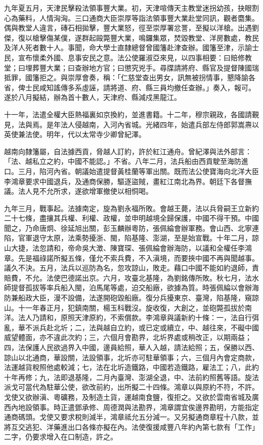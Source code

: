 \begin{pinyinscope}
九年夏五月，天津民擊殺法領事豐大業。初，天津喧傳天主教堂迷拐幼孩，抉眼割心為藥料，人情洶洶。三口通商大臣崇厚等詣法領事豐大業赴堂同訊，觀者麕集。偶與教堂人違言，磚石相拋擊，豐大業怒，徑至崇厚署忿詈，至擬以洋槍。出遇劉傑，復以槍擊傷某僕，遂群起毆斃豐大業，鳴鑼集眾，焚毀教堂、洋房數處，教民及洋人死者數十人。事聞，命大學士直隸總督曾國籓赴津查辦。國籓至津，示諭士民，宣布懷柔外國、息事安民之意。法公使羅淑亞來見，以四事相要：曰賠修教堂；曰埋葬豐大業；曰查辦地方官；曰懲究兇手。尋牒請將府、縣官及提督陳國瑞抵罪，國籓拒之。與崇厚會奏，稱：「仁慈堂查出男女，訊無被拐情事，懇降諭各省，俾士民咸知謠傳多系虛誣，請將道、府、縣三員均撤任查辦。」奏入，報可。遂於八月擬結，辦為首十數人，天津府、縣減戍黑龍江。

十一年，法遣全權大臣熱福裏如京換約，並進書籍。十二年，穆宗親政，各國請覲見，法與焉。是年法人侵越南，入河內省城。光緒四年，始遣兵部左侍郎郭嵩燾以英使兼法使。明年，代以太常寺少卿曾紀澤。

越南向隸籓屬，自法據西貢，脅越人訂約，許於紅江通舟。曾紀澤與法外部言：「法、越私立之約，中國不能認。」不省。八年二月，法兵船由西貢駛至海防進口。三月，陷河內省。朝議始遣提督黃桂蘭等軍出關。既而法公使寶海向北洋大臣李鴻章要求中國退兵，及通商保勝，驅逐盜賊，畫紅江南北為界。朝廷下各督撫議。法人見不允所求，遂欲增軍撤使以相恫喝。

九年三月，戰事起。法據南定，旋為劉永福所敗。會越王薨，法以兵脅嗣王立新約二十七條，盡攘其兵權、利權、政權，並申明越境全歸保護，中國不得干預。中國聞之，乃命唐炯、徐延旭出關，彭玉麟辦粵防，張佩綸會辦軍務。會山西、北寧連陷，官軍退守太原，法乘勢擾浙、閩，陷基隆、澎湖，至是始宣戰。十年二月，諒山大捷，法忽請和，帝命吳大澂、陳寶琛、張佩綸會辦海防，以議和全權任李鴻章。先是福祿諾所擬五條，僅允不索兵費，不入滇境，而要挾中國不再與聞越事。議久不決。五月，法兵以巡防為名，忽攻諒山，敗走。藉口中國不能如約退師，責賠費，不允。法使巴德諾出京。六月，攻臺北基隆，為劉銘傳所敗。秋七月，法水師提督孤拔等率兵船入閩，泊馬尾等處，迫交船廠，欲據為質。時張佩綸以會辦海防兼船政大臣，漫不設備，法遂開砲毀船廠。復分兵擾東京、臺灣，陷基隆，窺諒山。十一年春正月，犯鎮南關，楊玉科戰沒。旋收復，大創之，並砲斃孤拔於南洋。法人乃請和，原照天津原約，不索償款。李鴻章與議新約十條：一，法自行弭亂，華不派兵赴北圻；二，法與越自立約，或已定或續立，中、越往來，不礙中國威望體面，亦不違此次約；三，六個月會勘界，北圻界處或稍改正，以期兩益；四，法保護人民欲過界入中國，邊員給照，華人入越，請法給照；五，保勝以西、諒山以北通商，華設關，法設領事，北圻亦可駐華領事；六，三個月內會定商款，法運越貨稅照他處較減；七，法在北圻造鐵路，中國若造鐵路，雇法工；八，此約十年再修；九，法即退基隆，二月內臺灣、澎湖全退，中、法前約照舊等語。旋法派戈可當代為駐華公使，欲改前約，出所擬二十四條。鴻章以與原約不符，不許。戈使又欲辦滇、粵礦務，及制造土貨，運越南食鹽，復拒之。又欲於雲南省城及廣西內地設領事。時正遣鄧承修、周德潤與法勘界，鴻章謂宜俟邊界勘明，方能指定通商碼頭。戈使又要求稅則減半，鴻章祗允五分減一。又另擬通商章程十八款，並將互交逃犯、洋藥進出口各條亦擬在內。法使復援咸豐八年約內第七款有「工作」二字，仍要求增入在口制造，許之。


\end{pinyinscope}
